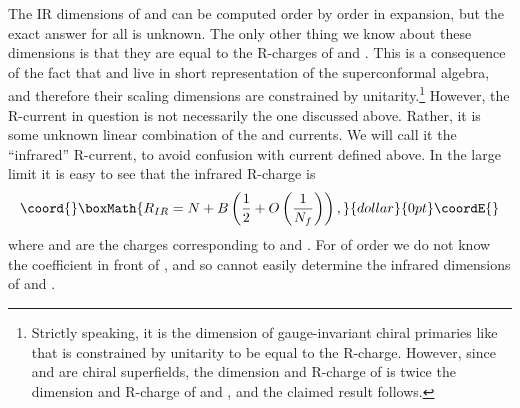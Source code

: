 \documentclass[a4paper,12pt, amsfonts, amssymb]{article}
\providecommand{\tQ}{{\tilde Q}}
\begin{document}
The IR dimensions of \coordHE{} and \myHighlight{$\tQ$}\coordHE{} can be computed order by order in
\coordHE{} expansion, but the exact answer for all \coordHE{} is unknown. 
The only other thing we know about these dimensions is that they are equal
to the R-charges of \coordHE{} and \myHighlight{$\tQ$}\coordHE{}. This is a consequence
of the fact that \coordHE{} and \myHighlight{$\tQ$}\coordHE{} live in short representation of the superconformal algebra, and therefore their scaling dimensions are 
constrained by unitarity.\footnote{Strictly speaking, it is the dimension 
of gauge-invariant chiral primaries like \myHighlight{$Q\tQ$}\coordHE{} that is constrained 
by unitarity to be equal to the R-charge. However, since \coordHE{} and \myHighlight{$\tQ$}\coordHE{} are chiral superfields, the dimension and R-charge of \myHighlight{$Q\tQ$}\coordHE{} is twice the dimension and R-charge of \coordHE{} and \myHighlight{$\tQ$}\coordHE{}, and the claimed result follows.}
However, the R-current in
question is not necessarily the one discussed above. Rather, it is
some unknown linear combination of the \coordHE{} and \coordHE{} currents. 
We will call it the ``infrared'' R-current, to avoid confusion with 
\coordHE{} current defined above. 
In the large \coordHE{} limit it is easy to see that the infrared R-charge is
$$\coord{}\boxMath{
R_{IR}=N+B\left(\frac{1}{2}+O\left(\frac{1}{N_f}\right)\right),
}{dollar}{0pt}\coordE{}$$
where \coordHE{} and \coordHE{} are the charges corresponding to \coordHE{} and \coordHE{}. 
For \coordHE{} of order \coordHE{} we do not know the coefficient in front of \coordHE{}, and so cannot easily determine the infrared dimensions of \coordHE{} and \myHighlight{$\tQ$}\coordHE{}.
\end{document}
